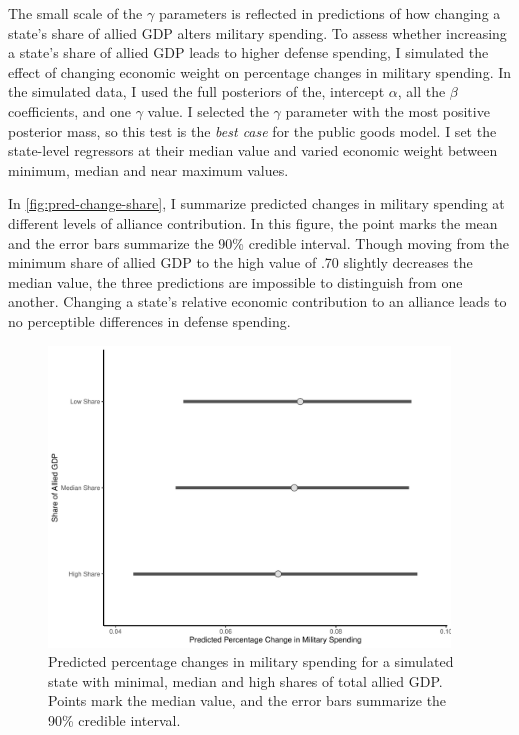 \documentclass[12pt]{article}
\begin{document}
The small scale of the $\gamma$ parameters is reflected in predictions of how changing a state's share of allied GDP alters military spending. 
To assess whether increasing a state's share of allied GDP leads to higher defense spending, I simulated the effect of changing economic weight on percentage changes in military spending. 
In the simulated data, I used the full posteriors of the, intercept $\alpha$, all the $\beta$ coefficients, and one $\gamma$ value. 
I selected the $\gamma$ parameter with the most positive posterior mass, so this test is the \emph{best case} for the public goods model. 
I set the state-level regressors at their median value and varied economic weight between minimum, median and near maximum values. 


In \autoref{fig:pred-change-share}, I summarize predicted changes in military spending at different levels of alliance contribution. 
In this figure, the point marks the mean and the error bars summarize the 90\% credible interval. 
Though moving from the minimum share of allied GDP to the high value of .70 slightly decreases the median value, the three predictions are impossible to distinguish from one another. 
Changing a state's relative economic contribution to an alliance leads to no perceptible differences in defense spending. 

\begin{figure}[htbp]
	\centering
		\includegraphics[width=0.95\textwidth]{pred-change-share.pdf}
	\caption{Predicted percentage changes in military spending for a simulated state with minimal, median and high shares of total allied GDP. Points mark the median value, and the error bars summarize the 90\% credible interval.}
	\label{fig:pred-change-share}
\end{figure}
\end{document}
